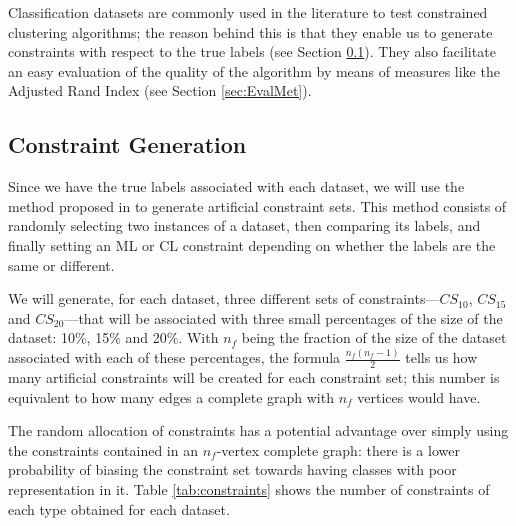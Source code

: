 \documentclass[review]{elsarticle}
\begin{document}
Classification datasets are commonly used in the literature to test constrained clustering algorithms; the reason behind this is that they enable us to generate constraints with respect to the true labels (see Section \ref{sec:ConstGent}). They also facilitate an easy evaluation of the quality of the algorithm by means of measures like the Adjusted Rand Index (see Section \ref{sec:EvalMet}).

\subsection{Constraint Generation} \label{sec:ConstGent}

Since we have the true labels associated with each dataset, we will use the method proposed in \cite{wagstaff2001constrained} to generate artificial constraint sets. This method consists of randomly selecting two instances of a dataset, then comparing its labels, and finally setting an ML or CL constraint depending on whether the labels are the same or different.

We will generate, for each dataset, three different sets of constraints---$CS_{10}$, $CS_{15}$ and $CS_{20}$---that will be associated with three small percentages of the size of the dataset: 10\%, 15\% and 20\%. With $n_f$ being the fraction of the size of the dataset associated with each of these percentages, the formula $\frac{n_f(n_f-1)}{2}$ tells us how many artificial constraints will be created for each constraint set; this number is equivalent to how many edges a complete graph with $n_f$ vertices would have.

The random allocation of constraints has a potential advantage over simply using the constraints contained in an $n_f$-vertex complete graph: there is a lower probability of biasing the constraint set towards having classes with poor representation in it. Table \ref{tab:constraints} shows the number of constraints of each type obtained for each dataset.
\end{document}

